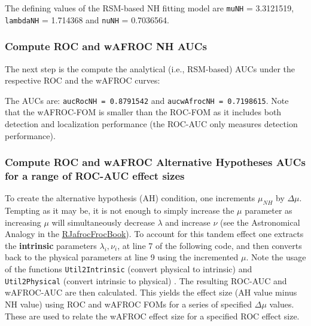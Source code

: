 \documentclass[
]{book}
\newenvironment{Shaded}{\begin{snugshade}}{\end{snugshade}}
\newcommand{\AttributeTok}[1]{\textcolor[rgb]{0.77,0.63,0.00}{#1}}
\newcommand{\FunctionTok}[1]{\textcolor[rgb]{0.00,0.00,0.00}{#1}}
\newcommand{\NormalTok}[1]{#1}
\newcommand{\OtherTok}[1]{\textcolor[rgb]{0.56,0.35,0.01}{#1}}
\newcommand{\SpecialCharTok}[1]{\textcolor[rgb]{0.00,0.00,0.00}{#1}}
\begin{document}
The defining values of the RSM-based NH fitting model are \texttt{muNH} = 3.3121519, \texttt{lambdaNH} = 1.714368 and \texttt{nuNH} = 0.7036564.

\hypertarget{compute-roc-and-wafroc-nh-aucs}{%
\subsubsection{Compute ROC and wAFROC NH AUCs}\label{compute-roc-and-wafroc-nh-aucs}}

The next step is the compute the analytical (i.e., RSM-based) AUCs under the respective ROC and the wAFROC curves:

\begin{Shaded}
\end{Shaded}

The AUCs are: \texttt{aucRocNH\ =\ 0.8791542} and \texttt{aucwAfrocNH\ =\ 0.7198615}. Note that the wAFROC-FOM is smaller than the ROC-FOM as it includes both detection and localization performance (the ROC-AUC only measures detection performance).

\hypertarget{compute-roc-and-wafroc-alternative-hypotheses-aucs-for-a-range-of-roc-auc-effect-sizes}{%
\subsubsection{Compute ROC and wAFROC Alternative Hypotheses AUCs for a range of ROC-AUC effect sizes}\label{compute-roc-and-wafroc-alternative-hypotheses-aucs-for-a-range-of-roc-auc-effect-sizes}}

To create the alternative hypothesis (AH) condition, one increments \(\mu_{NH}\) by \(\Delta\mu\). Tempting as it may be, it is not enough to simply increase the \(\mu\) parameter as increasing \(\mu\) will simultaneously decrease \(\lambda\) and increase \(\nu\) (see the Astronomical Analogy in the \href{https://dpc10ster.github.io/RJafrocFrocBook/froc-paradigm.html\#froc-paradigm-solar-analogy}{RJafrocFrocBook}). To account for this tandem effect one extracts the \textbf{intrinsic} parameters \(\lambda_i, \nu_i\), at line 7 of the following code, and then converts back to the physical parameters at line 9 using the incremented \(\mu\). Note the usage of the functions \texttt{Util2Intrinsic} (convert physical to intrinsic) and \texttt{Util2Physical} (convert intrinsic to physical) . The resulting ROC-AUC and wAFROC-AUC are then calculated. This yields the effect size (AH value minus NH value) using ROC and wAFROC FOMs for a series of specified \(\Delta\mu\) values. These are used to relate the wAFROC effect size for a specified ROC effect size.
\end{document}
